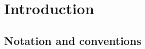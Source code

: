 \chapter{Introduction}
\label{frontmatter:introduction}


\section*{Notation and conventions}
\label{frontmatter:introduction:notation}

